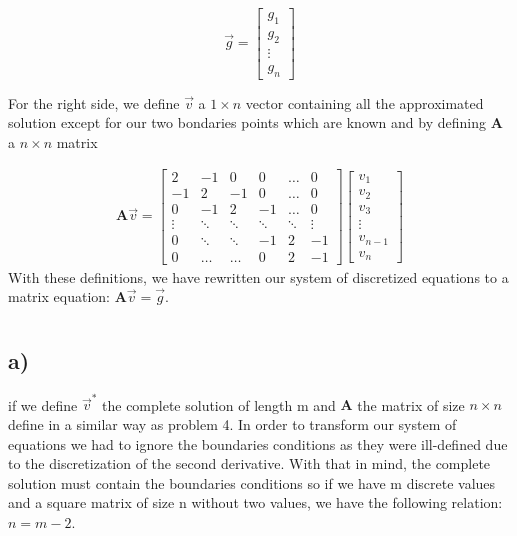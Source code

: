 \documentclass[a4paper,10pt,english]{article}
\begin{document}
			
			\begin{equation*}
				\vec{g}=\begin{bmatrix}
					g_1 \\
					g_2 \\
					\vdots \\
					g_{n}
				\end{bmatrix}
			\end{equation*}
			
			For the right side, we define $\vec{v}$ a $1 \times n$ vector containing all
			the approximated solution except for our two bondaries points which are known
			and by defining $\mathbf{A}$ a $n \times n$ matrix
			
			\begin{align}
				\mathbf{A}\vec{v} = \begin{bmatrix}
					2 & -1 & 0 & 0 & \dots & 0 \\
					-1 & 2 & -1& 0 & \dots & 0\\
					0 & -1 & 2 & -1 & \dots & 0\\
					\vdots & \ddots &  \ddots & \ddots & \ddots & \vdots \\
					0 & \ddots &  \ddots & -1 & 2 & -1 \\
					0 & \dots &  \dots & 0 & 2 & -1
				\end{bmatrix}
				\begin{bmatrix}
					v_1 \\
					v_2 \\
					v_3 \\
					\vdots \\
					v_{n - 1} \\
					v_{n}
				\end{bmatrix}
			\end{align}
			With these definitions, we have rewritten our system of discretized equations to
			a matrix equation: $\mathbf{A}\vec{v} = \vec{g}$.
			
			
			
			
			\section{} %
			
			\subsection{a)}
			if we define $\vec{v}^{*}$ the complete solution of length m and
			$\mathbf{A}$ the matrix of size $n\times n $ define in a similar way as problem
			4. In order to transform our system of equations we had to ignore the boundaries
			conditions as they were ill-defined due to the discretization of the second
			derivative. With that in mind, the complete solution must contain the boundaries
			conditions so if we have m discrete values and a square matrix of size n without
			two values, we have the following relation: $n = m-2$.
			
\end{document}
